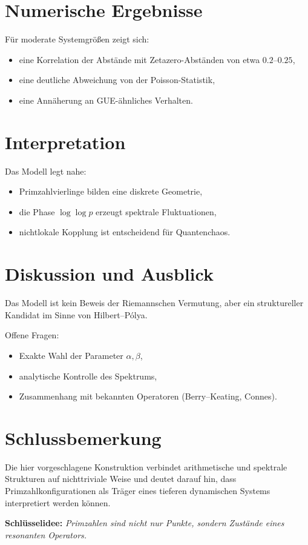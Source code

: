 \documentclass[11pt,a4paper]{article}
\begin{document}
	\section{Numerische Ergebnisse}
	
	Für moderate Systemgrößen zeigt sich:
	
	\begin{itemize}
		\item eine Korrelation der Abstände mit Zetazero-Abständen von etwa $0.2$--$0.25$,
		\item eine deutliche Abweichung von der Poisson-Statistik,
		\item eine Annäherung an GUE-ähnliches Verhalten.
	\end{itemize}
	
	\section{Interpretation}
	
	Das Modell legt nahe:
	
	\begin{itemize}
		\item Primzahlvierlinge bilden eine diskrete Geometrie,
		\item die Phase $\log\log p$ erzeugt spektrale Fluktuationen,
		\item nichtlokale Kopplung ist entscheidend für Quantenchaos.
	\end{itemize}
	
	\section{Diskussion und Ausblick}
	
	Das Modell ist kein Beweis der Riemannschen Vermutung, aber ein struktureller Kandidat im Sinne von Hilbert--Pólya.
	
	Offene Fragen:
	
	\begin{itemize}
		\item Exakte Wahl der Parameter $\alpha, \beta$,
		\item analytische Kontrolle des Spektrums,
		\item Zusammenhang mit bekannten Operatoren (Berry--Keating, Connes).
	\end{itemize}
	
	\section{Schlussbemerkung}
	
	Die hier vorgeschlagene Konstruktion verbindet arithmetische und spektrale Strukturen auf nichttriviale Weise und deutet darauf hin, dass Primzahlkonfigurationen als Träger eines tieferen dynamischen Systems interpretiert werden können.
	
	\bigskip
	
	\noindent
	\textbf{Schlüsselidee:}
	\emph{Primzahlen sind nicht nur Punkte, sondern Zustände eines resonanten Operators.}
	
\end{document}
